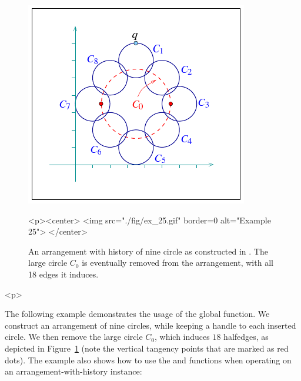 
\begin{figure}[!htp]
\begin{ccTexOnly}
  \begin{center}
  \includegraphics{Arrangement_2/fig/ex_25}
  \end{center}
\end{ccTexOnly}
\begin{ccHtmlOnly}
  <p><center>
  <img src="./fig/ex_25.gif" border=0 alt="Example 25">
  </center>
\end{ccHtmlOnly}
\caption{An arrangement with history of nine circle as constructed in 
. The large circle $C_0$ is eventually removed from the
arrangement, with all 18 edges it induces.}
\label{arr_fig:ex_25}
\end{figure}

\begin{ccHtmlOnly}<p>\end{ccHtmlOnly}
The following example demonstrates the usage of the global 
function. We construct an arrangement of nine circles, while keeping a handle
to each inserted circle. We then remove the large circle $C_0$, which induces
$18$ halfedges, as depicted in Figure~\ref{arr_fig:ex_25} (note the 
vertical tangency points that are marked as red dots). The example also shows
how to use the  and  functions when
operating on an arrangement-with-history instance:


